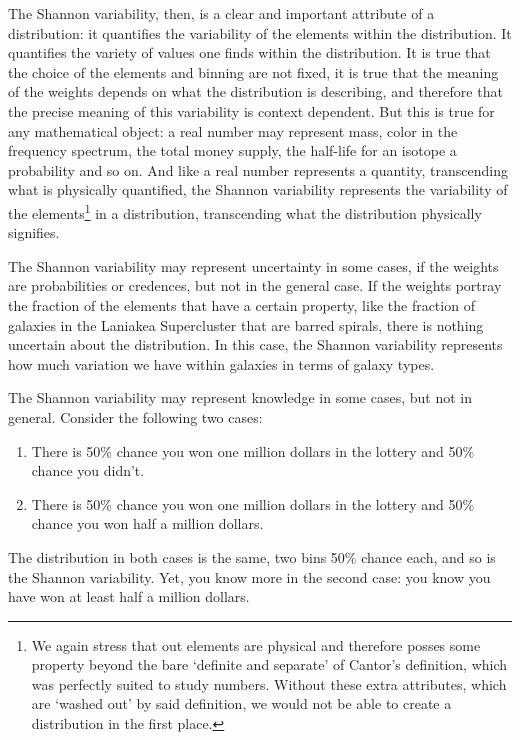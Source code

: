 \documentclass{article}
\begin{document}
The Shannon variability, then, is a clear and important attribute of a distribution: it quantifies the variability of the elements within the distribution. It quantifies the variety of values one finds within the distribution. It is true that the choice of the elements and binning are not fixed, it is true that the meaning of the weights depends on what the distribution is describing, and therefore that the precise meaning of this variability is context dependent. But this is true for any mathematical object: a real number may represent mass, color in the frequency spectrum, the total money supply, the half-life for an isotope a probability and so on. And like a real number represents a quantity, transcending what is physically quantified, the Shannon variability represents the variability of the elements\footnote{We again stress that out elements are physical and therefore posses some property beyond the bare `definite and separate' of Cantor's definition, which was perfectly suited to study numbers. Without these extra attributes, which are `washed out' by said definition, we would not be able to create a distribution in the first place.} in a distribution, transcending what the distribution physically signifies.

The Shannon variability may represent uncertainty in some cases, if the weights are probabilities or credences, but not in the general case. If the weights portray the fraction of the elements that have a certain property, like the fraction of galaxies in the Laniakea Supercluster that are barred spirals, there is nothing uncertain about the distribution. In this case, the Shannon variability represents how much variation we have within galaxies in terms of galaxy types.

The Shannon variability may represent knowledge in some cases, but not in general. Consider the following two cases:
\begin{enumerate}
\item There is 50\% chance you won one million dollars in the lottery and 50\% chance you didn't.
\item There is 50\% chance you won one million dollars in the lottery and 50\% chance you won half a million dollars.
\end{enumerate}
The distribution in both cases is the same, two bins 50\% chance each, and so is the Shannon variability. Yet, you know more in the second case: you know you have won at least half a million dollars.
\end{document}
